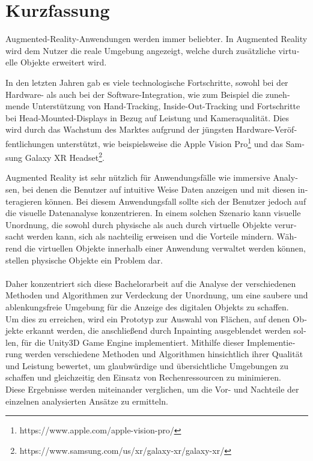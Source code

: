 \chapter{Kurzfassung}

\begin{german}
Augmented-Reality-Anwendungen werden immer beliebter. In Augmented Reality wird dem Nutzer die reale Umgebung angezeigt, welche durch zusätzliche virtuelle Objekte erweitert wird.

In den letzten Jahren gab es viele technologische Fortschritte, sowohl bei der Hardware- als auch bei der Software-Integration, wie zum Beispiel die zunehmende Unterstützung von Hand-Tracking, 
Inside-Out-Tracking und Fortschritte bei Head-Mounted-Displays in Bezug auf Leistung und Kameraqualität. Dies wird durch das Wachstum des Marktes aufgrund der jüngsten Hardware-Veröffentlichungen unterstützt, 
wie beispielsweise die Apple Vision Pro\footnote{https://www.apple.com/apple-vision-pro/} und das Samsung Galaxy XR Headset\footnote{https://www.samsung.com/us/xr/galaxy-xr/galaxy-xr/}.

Augmented Reality ist sehr nützlich für Anwendungsfälle wie immersive Analysen, bei denen die Benutzer auf intuitive Weise Daten anzeigen und mit diesen interagieren können. Bei diesem Anwendungsfall sollte sich der Benutzer jedoch auf die visuelle Datenanalyse konzentrieren. In einem solchen Szenario kann visuelle Unordnung, die sowohl durch physische als auch durch virtuelle Objekte verursacht werden kann, sich als nachteilig erweisen und die Vorteile mindern. 
Während die virtuellen Objekte innerhalb einer Anwendung verwaltet werden können, stellen physische Objekte ein Problem dar.
\\\\
Daher konzentriert sich diese Bachelorarbeit auf die Analyse der verschiedenen Methoden und Algorithmen zur Verdeckung der Unordnung, um eine saubere und ablenkungsfreie Umgebung für die Anzeige des digitalen Objekts zu schaffen. 
\\
Um dies zu erreichen, wird ein Prototyp zur Auswahl von Flächen, auf denen Objekte erkannt werden, die anschließend durch Inpainting ausgeblendet werden sollen, für die Unity3D Game Engine implementiert. Mithilfe dieser Implementierung werden verschiedene Methoden und Algorithmen hinsichtlich ihrer Qualität und Leistung bewertet, um glaubwürdige und übersichtliche Umgebungen zu schaffen und gleichzeitig den Einsatz von Rechenressourcen zu minimieren.
\\
Diese Ergebnisse werden miteinander verglichen, um die Vor- und Nachteile der einzelnen analysierten Ansätze zu ermitteln.
\end{german}